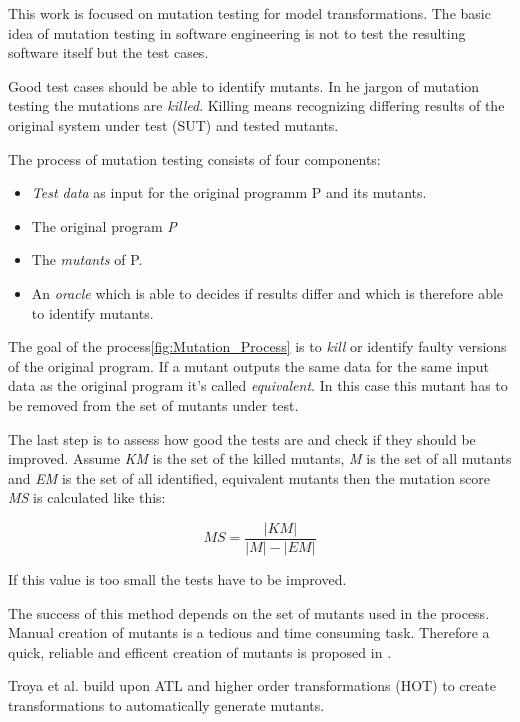 \documentclass{llncs}
\begin{document}
This work is focused on mutation testing for model transformations. The basic idea of mutation testing in software engineering is not to test the resulting software itself but the test cases.

Good test cases should be able to identify mutants. In he jargon of mutation testing the mutations are \emph{killed}. Killing means recognizing differing results of the original system under test (SUT) and tested mutants.\cite{MatMottu2006}

The process of mutation testing consists of four components: 
\begin{itemize}
	\item \textit{Test data} as input for the original programm P and its mutants.
	\item The original program \textit{P}
	\item The \textit{mutants} of P.
	\item An \textit{oracle} which is able to decides if results differ and which is therefore able to identify mutants.
\end{itemize}

The goal of the process\ref{fig:Mutation_Process} is to \textit{kill} or identify faulty versions of the original program. If a mutant outputs the same data for the same input data as the original program it's called \textit{equivalent}. In this case this mutant has to be removed from the set of mutants under test.

The last step is to assess how good the tests are and check if they should be improved. Assume \textit{KM} is the set of the killed mutants, \textit{M} is the set of all mutants and \textit{EM} is the set of all identified, equivalent mutants then the mutation score \textit{MS} is calculated like this:\cite{mutationssurvey:yue}

\begin{equation}
	MS = \frac{\left|KM\right|}{\left|M\right| - \left|EM\right|}
	\label{eq:ms}
\end{equation}

If this value is too small the tests have to be improved. 

The success of this method depends on the set of mutants used in the process. Manual creation of mutants is a tedious and time consuming task. Therefore a quick, reliable and efficent creation of mutants is proposed in \cite{troya:2015}.

Troya et al. build upon ATL and higher order transformations (HOT) to create transformations to automatically generate mutants. 
\end{document}
